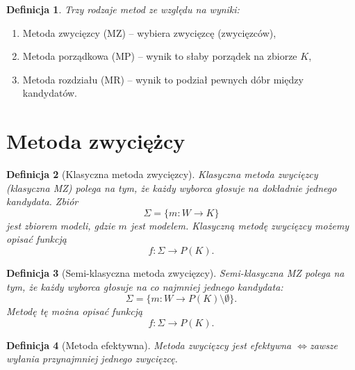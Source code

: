 \documentclass[12pt,a4paper]{article}
\theoremstyle{break}
\newtheorem{definition}{Definicja}[section]
\newcommand{\witw}{$\Leftrightarrow$}
\begin{document}
\begin{definition}
	Trzy rodzaje metod ze względu na wyniki:
\end{definition}

\begin{enumerate}[1)]
	\item Metoda zwycięzcy (MZ) – wybiera zwycięzcę (zwycięzców),
	\item Metoda porządkowa (MP) – wynik to słaby porządek na zbiorze $K$,
	\item Metoda rozdziału (MR) – wynik to podział pewnych dóbr między kandydatów.
\end{enumerate}

\newpage

\section{Metoda zwyciężcy}
\begin{definition}[Klasyczna metoda zwycięzcy]
	Klasyczna metoda zwycięzcy (klasyczna MZ) polega na tym, że każdy wyborca głosuje na dokładnie jednego kandydata. Zbiór
	$$\Sigma = \{m:W\rightarrow K\}$$
	jest zbiorem modeli, gdzie $m$ jest modelem. Klasyczną metodę zwycięzcy możemy opisać funkcją
	$$f: \Sigma \rightarrow P(K).$$
\end{definition}

\begin{definition}[Semi-klasyczna metoda zwycięzcy]
	Semi-klasyczna MZ polega na tym, że każdy wyborca głosuje na co najmniej jednego kandydata:
	$$\Sigma = \{m:W\rightarrow P(K)\setminus \emptyset\}.$$
	Metodę tę można opisać funkcją
	$$f: \Sigma \rightarrow P(K).$$
\end{definition}

\begin{definition}[Metoda efektywna]
	Metoda zwycięzcy jest efektywna \witw zawsze wyłania przynajmniej jednego zwycięzcę.
\end{definition}
\end{document}

